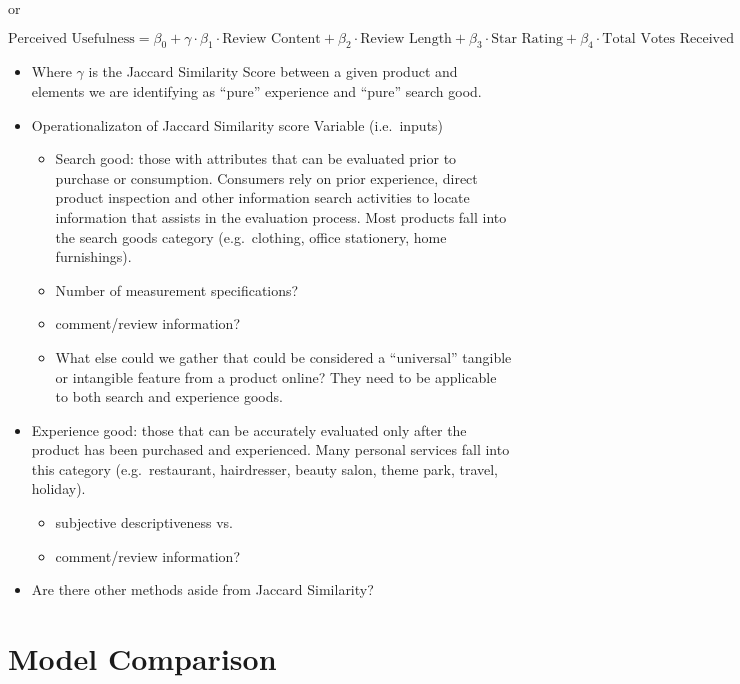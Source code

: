 \documentclass[
  letterpaper,
  DIV=11,
  numbers=noendperiod]{scrreprt}
\begin{document}
or

\[
\text{Perceived Usefulness} = \beta_0 + \gamma\cdot\beta_1\cdot\text{Review Content} + \beta_2 \cdot \text{Review Length} + \beta_3\cdot \text{Star Rating} + \beta_4 \cdot \text{Total Votes Received}
\]

\begin{itemize}
\item
  Where \(\gamma\) is the Jaccard Similarity Score between a given
  product and elements we are identifying as ``pure'' experience and
  ``pure'' search good.
\item
  Operationalizaton of Jaccard Similarity score Variable (i.e.~inputs)

  \begin{itemize}
  \item
    Search good: those with attributes that can be evaluated prior to
    purchase or consumption. Consumers rely on prior experience, direct
    product inspection and other information search activities to locate
    information that assists in the evaluation process. Most products
    fall into the search goods category (e.g.~clothing, office
    stationery, home furnishings).
  \item
    Number of measurement specifications?
  \item
    comment/review information?
  \item
    What else could we gather that could be considered a ``universal''
    tangible or intangible feature from a product online? They need to
    be applicable to both search and experience goods.
  \end{itemize}
\item
  Experience good: those that can be accurately evaluated only after the
  product has been purchased and experienced. Many personal services
  fall into this category (e.g.~restaurant, hairdresser, beauty salon,
  theme park, travel, holiday).

  \begin{itemize}
  \item
    subjective descriptiveness vs.~
  \item
    comment/review information?
  \end{itemize}
\item
  Are there other methods aside from Jaccard Similarity?
\end{itemize}

\section{Model Comparison}\label{model-comparison}
\end{document}
